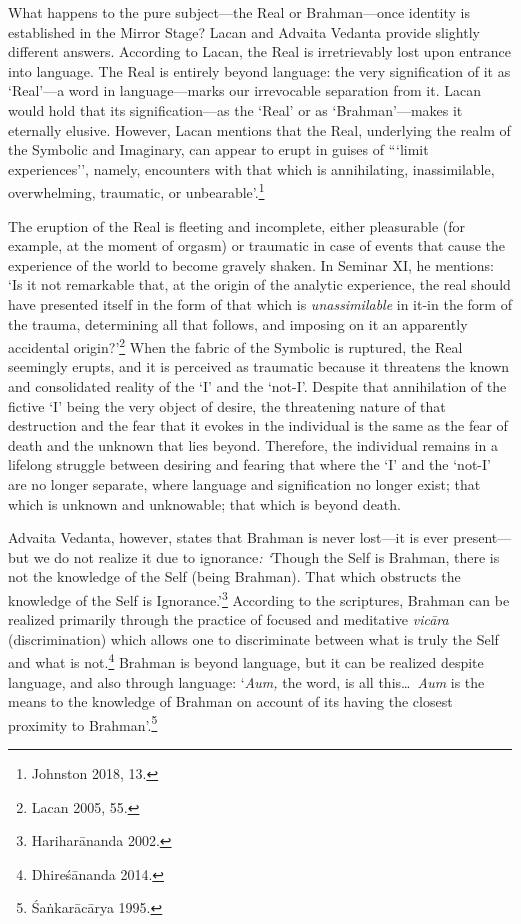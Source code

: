 What happens to the pure subject---the Real or Brahman---once identity
is established in the Mirror Stage? Lacan and Advaita Vedanta provide
slightly different answers. According to Lacan, the Real is
irretrievably lost upon entrance into language. The Real is entirely
beyond language: the very signification of it as `Real'---a word in
language---marks our irrevocable separation from it. Lacan would hold
that its signification---as the `Real' or as `Brahman'---makes it
eternally elusive. However, Lacan mentions that the Real, underlying the
realm of the Symbolic and Imaginary, can appear to erupt in guises of
```limit experiences'', namely, encounters with that which is
annihilating, inassimilable, overwhelming, traumatic, or unbearable'.\footnote{Johnston 2018, 13.}

The eruption of the Real is fleeting and incomplete, either pleasurable
(for example, at the moment of orgasm) or traumatic in case of events
that cause the experience of the world to become gravely shaken. In
Seminar XI, he mentions: `Is it not remarkable that, at the origin of
the analytic experience, the real should have presented itself in the
form of that which is \emph{unassimilable} in it-in the form of the
trauma, determining all that follows, and imposing on it an apparently
accidental origin?'\footnote{Lacan 2005, 55.} When the fabric of the Symbolic is
ruptured, the Real seemingly erupts, and it is perceived as traumatic
because it threatens the known and consolidated reality of the `I' and
the `not-I'. Despite that annihilation of the fictive `I' being the very
object of desire, the threatening nature of that destruction and the
fear that it evokes in the individual is the same as the fear of death
and the unknown that lies beyond. Therefore, the individual remains in a
lifelong struggle between desiring and fearing that where the `I' and
the `not-I' are no longer separate, where language and signification no
longer exist; that which is unknown and unknowable; that which is beyond
death.

Advaita Vedanta, however, states that Brahman is never lost---it is
ever present---but we do not realize it due to ignorance\emph{:
`}Though the Self is Brahman, there is not the knowledge of the Self
(being Brahman). That which obstructs the knowledge of the Self is
Ignorance.'\footnote{Harihar\=ananda 2002.} According to the scriptures, Brahman
can be realized primarily through the practice of focused and meditative
\emph{vic\=ara} (discrimination) which allows one to discriminate between
what is truly the Self and what is not.\footnote{Dhire\'s\=ananda 2014.}
Brahman is beyond language, but it can be realized despite language, and
also through language: `\emph{Aum,} the word, is all this\ldots\
\emph{Aum} is the means to the knowledge of Brahman on account of its
having the closest proximity to Brahman'.\footnote{\'Sa\.nkar\=ac\=arya 1995.}

